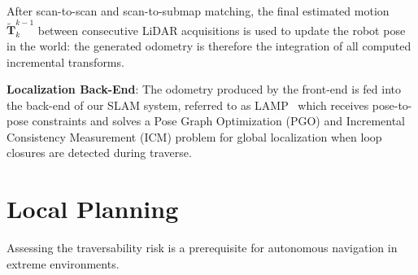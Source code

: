 \documentclass[letterpaper, 10pt, conference]{ieeeconf}      %
\newcommand{\ph}[1]{{\textbf{#1}:}} %
\newcommand{\rev}[1]{{\color{blue} #1 }} %
\begin{document}
{After scan-to-scan and scan-to-submap matching, the final estimated motion $\tilde{\textbf{T}}^{k-1}_{k}$ between consecutive LiDAR acquisitions is used to update the robot pose in the world: the generated odometry is therefore the integration of all computed incremental transforms. 


}



\rev{\ph{Localization Back-End} The odometry produced by the front-end is fed into the back-end of our SLAM system, referred to as LAMP~\cite{Ebadi2020} which receives pose-to-pose constraints and solves a Pose Graph Optimization (PGO) and Incremental Consistency Measurement (ICM) problem for global localization when loop closures are detected during traverse.}



\section{Local Planning}\label{sec:local_planning}

Assessing the traversability risk is a prerequisite for autonomous navigation in extreme environments.
\end{document}
